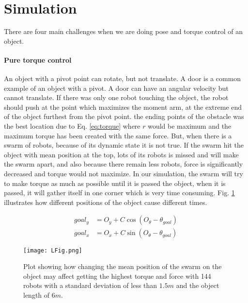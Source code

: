 
\section{Simulation}\label{sec:simulation}
There are four main challenges when we are doing pose and torque control of an object. 
\paragraph{Pure torque control} 
An object with a pivot point can rotate, but not translate. A door is a common example of an object with a pivot. A door can have an angular velocity but cannot translate. 
 If there was only one robot touching the object, the robot should push at the point which maximizes the moment arm, at the extreme end of the object furthest from the pivot point.
 the ending points of the obstacle was the best location due to Eq. \ref{eq:torque} where $r$ would be maximum and the maximum torque has been created with the same force. But, when there is a swarm of robots, because of its dynamic state it is not true. If the swarm hit the object with mean position at the top, lots of its robots is missed and will make the swarm apart, and also because there remain less robots, force is significantly decreased and torque would not maximize. In our simulation, the swarm will try to make torque as much as possible until it is passed the object, when it is passed, it will gather itself in one corner which is very time consuming. Fig. \ref{fig:LFig} illustrates how different positions of the object cause different times. 
 
\begin{align}\nonumber
goal_y &= O_y + C \cos(O_{\theta}- \theta_{goal})\\
goal_x &= O_x + C \sin(O_{\theta}- \theta_{goal})
\end{align}

\begin{figure}
\begin{center}
	\texttt{[image: LFig.png]}
\end{center}
\vspace{-1em}
\caption{\label{fig:LFig}
Plot showing how changing the mean position of the swarm on the object may affect getting the highest torque and force with 144 robots with a standard deviation of less than $1.5 m$ and the object length of $6m$.
}
\vspace{-1em}
\end{figure}
